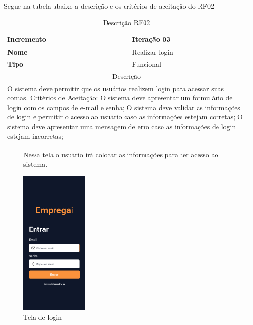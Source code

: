 \clearpage
Segue na tabela abaixo a descrição e os critérios de aceitação do RF02
\begin{table}[htb]
	\centering
	\caption{\label{Formatação do texto.}Descrição RF02}	
	\begin{tabular}{|l|p{11cm}|}
		\hline
		\textbf{Incremento}    & Iteração 03\\ \hline
		\textbf{Nome}    & Realizar login\\ \hline
		\textbf{Tipo}    & Funcional\\ \hline
		\multicolumn{2}{|c|}{Descrição}\\ \hline
		\multicolumn{2}{|p{12cm}|}{
			O sistema deve permitir que os usuários realizem login para acessar suas contas. \newline
			\newline Critérios de Aceitação: \newline
			O sistema deve apresentar um formulário de login com os campos de e-mail e senha; \newline
			\newline O sistema deve validar as informações de login e permitir o acesso ao usuário caso as informações estejam corretas;\newline
			\newline O sistema deve apresentar uma mensagem de erro caso as informações de login estejam incorretas;
			}\\ \hline
	\end{tabular}
\end{table}

\clearpage
\begin{figure}[htb]
	Nessa tela o usuário irá colocar as informações para ter acesso ao sistema.
	\caption{Tela de login}
	\begin{center}
		\includegraphics[width=0.3\textwidth]{images/RF02.png}
	\end{center}
\end{figure}

